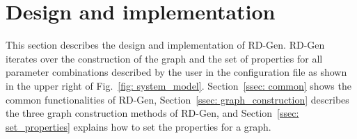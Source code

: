 \section{Design and implementation}
\label{sec: design_implementation}

This section describes the design and implementation of RD-Gen.
RD-Gen iterates over the construction of the graph and the set of properties for all parameter combinations described by the user in the configuration file as shown in the upper right of Fig.~\ref{fig: system_model}.
Section~\ref{ssec: common} shows the common functionalities of RD-Gen, Section~\ref{ssec: graph_construction} describes the three graph construction methods of RD-Gen, and Section~\ref{ssec: set_properties} explains how to set the properties for a graph.




